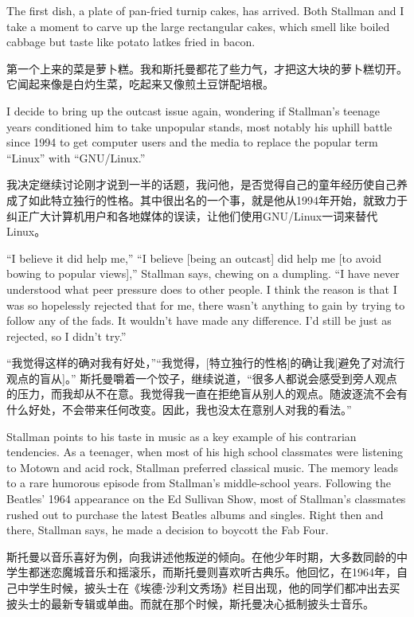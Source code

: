 \ifdefined\eng
The first dish, a plate of pan-fried turnip cakes, has arrived. Both Stallman and I take a moment to carve up the large rectangular cakes, which smell like boiled cabbage but taste like potato latkes fried in bacon.
\fi

\ifdefined\chs
第一个上来的菜是萝卜糕。我和斯托曼都花了些力气，才把这大块的萝卜糕切开。它闻起来像是白灼生菜，吃起来又像煎土豆饼配培根。
\fi

\ifdefined\eng
I decide to bring up the outcast issue again, wondering if Stallman's teenage years conditioned him to take unpopular stands, most notably his uphill battle since 1994 to get computer users and the media to replace the popular term ``Linux'' with ``GNU/Linux.''
\fi

\ifdefined\chs
我决定继续讨论刚才说到一半的话题，我问他，是否觉得自己的童年经历使自己养成了如此特立独行的性格。其中很出名的一个事，就是他从1994年开始，就致力于纠正广大计算机用户和各地媒体的误读，让他们使用GNU/Linux一词来替代Linux。
\fi

\ifdefined\eng
\ifdefined\vone ``I believe it did help me,'' \fi\ifdefined\vtwo``I believe [being an outcast] did help me [to avoid bowing to popular views],'' \fi Stallman says, chewing on a dumpling. ``I have never understood what peer pressure does to other people. I think the reason is that I was so hopelessly rejected that for me, there wasn't anything to gain by trying to follow any of the fads. It wouldn't have made any difference. I'd still be just as rejected, so I didn't try.''
\fi

\ifdefined\chs
\ifdefined\vone ``我觉得这样的确对我有好处，''\fi\ifdefined\vtwo ``我觉得，[特立独行的性格]的确让我[避免了对流行观点的盲从]。'' \fi 斯托曼嚼着一个饺子，继续说道，``很多人都说会感受到旁人观点的压力，而我却从不在意。我觉得我一直在拒绝盲从别人的观点。随波逐流不会有什么好处，不会带来任何改变。因此，我也没太在意别人对我的看法。''
\fi

\ifdefined\eng
Stallman points to his taste in music as a key example of his contrarian tendencies. As a teenager, when most of his high school classmates were listening to Motown and acid rock, Stallman preferred classical music. The memory leads to a rare humorous episode from Stallman's middle-school years. Following the Beatles' 1964 appearance on the Ed Sullivan Show, most of Stallman's classmates rushed out to purchase the latest Beatles albums and singles. Right then and there, Stallman says, he made a decision to boycott the Fab Four.
\fi

\ifdefined\chs
斯托曼以音乐喜好为例，向我讲述他叛逆的倾向。在他少年时期，大多数同龄的中学生都迷恋魔城音乐和摇滚乐，而斯托曼则喜欢听古典乐。他回忆，在1964年，自己中学生时候，披头士在《埃德⋅沙利文秀场》栏目出现，他的同学们都冲出去买披头士的最新专辑或单曲。而就在那个时候，斯托曼决心抵制披头士音乐。
\fi

